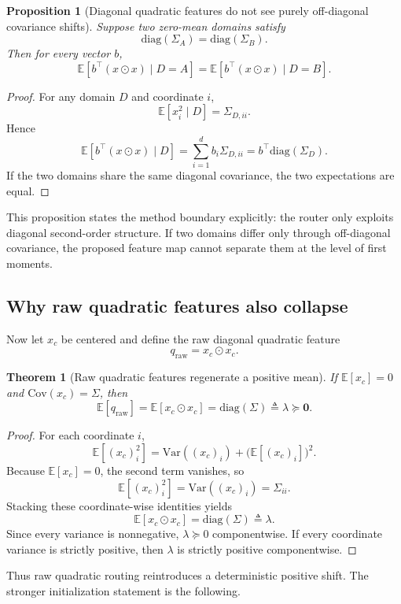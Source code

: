 \documentclass[11pt]{article}
\newtheorem{theorem}{Theorem}
\newtheorem{proposition}{Proposition}
\begin{document}
\begin{proposition}[Diagonal quadratic features do not see purely off-diagonal covariance shifts]
Suppose two zero-mean domains satisfy
\[
\mathrm{diag}(\Sigma_A)=\mathrm{diag}(\Sigma_B).
\]
Then for every vector $b$,
\[
\mathbb E[b^\top (x\odot x)\mid D=A]
=
\mathbb E[b^\top (x\odot x)\mid D=B].
\]
\end{proposition}

\begin{proof}
For any domain $D$ and coordinate $i$,
\[
\mathbb E[x_i^2\mid D]=\Sigma_{D,ii}.
\]
Hence
\[
\mathbb E[b^\top(x\odot x)\mid D]
=
\sum_{i=1}^d b_i \Sigma_{D,ii}
=
b^\top \mathrm{diag}(\Sigma_D).
\]
If the two domains share the same diagonal covariance, the two expectations are equal.
\end{proof}

This proposition states the method boundary explicitly: the router only exploits diagonal second-order structure. If two domains differ only through off-diagonal covariance, the proposed feature map cannot separate them at the level of first moments.

\subsection{Why raw quadratic features also collapse}
Now let $x_c$ be centered and define the raw diagonal quadratic feature
\[
q_{\mathrm{raw}} = x_c \odot x_c.
\]

\begin{theorem}[Raw quadratic features regenerate a positive mean]
If $\mathbb{E}[x_c]=0$ and $\mathrm{Cov}(x_c)=\Sigma$, then
\[
\mathbb{E}[q_{\mathrm{raw}}]
=
\mathbb{E}[x_c\odot x_c]
=
\mathrm{diag}(\Sigma)
\triangleq \lambda
\succeq
\mathbf{0}.
\]
\end{theorem}

\begin{proof}
For each coordinate $i$,
\[
\mathbb{E}[(x_c)_i^2]
=
\mathrm{Var}((x_c)_i)+\big(\mathbb{E}[(x_c)_i]\big)^2.
\]
Because $\mathbb{E}[x_c]=0$, the second term vanishes, so
\[
\mathbb{E}[(x_c)_i^2]
=
\mathrm{Var}((x_c)_i)
=
\Sigma_{ii}.
\]
Stacking these coordinate-wise identities yields
\[
\mathbb{E}[x_c\odot x_c]
=
\mathrm{diag}(\Sigma)
\triangleq \lambda.
\]
Since every variance is nonnegative, $\lambda\succeq 0$ componentwise. If every coordinate variance is strictly positive, then $\lambda$ is strictly positive componentwise.
\end{proof}

Thus raw quadratic routing reintroduces a deterministic positive shift. The stronger initialization statement is the following.
\end{document}
